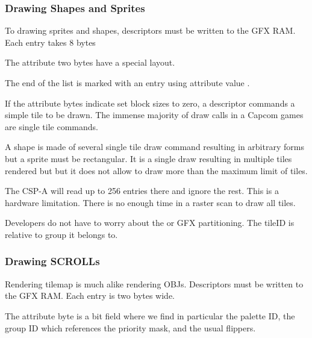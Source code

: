 \subsubsection{Drawing Shapes and Sprites}
To drawing sprites and shapes, descriptors must be written to the GFX RAM. Each entry takes 8 bytes

 

The attribute two bytes have a special layout.

 

The end of the list is marked with an entry using attribute value . 

If the attribute bytes indicate set block sizes to zero, a descriptor commands a simple tile to be drawn. The immense majority of draw calls in a Capcom games are single tile commands.

A shape is made of several single tile draw command resulting in arbitrary forms but a sprite must be rectangular. It is a single draw resulting in multiple tiles rendered but but it does not allow to draw more than the maximum limit of tiles.

The CSP-A will read up to 256 entries there and ignore the rest. This is a hardware limitation. There is no enough time in a raster scan to draw all tiles.

Developers do not have to worry about the  or GFX partitioning. The tileID is relative to group it belongs to.

\subsubsection{Drawing SCROLLs}

Rendering tilemap is much alike rendering OBJs. Descriptors must be written to the GFX RAM. Each entry is two bytes wide.

 

The attribute byte is a bit field where we find in particular the palette ID, the group ID which references the priority mask, and the usual flippers.

 

